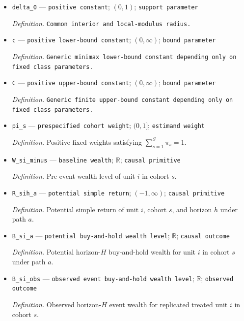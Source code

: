 \documentclass{article}
\begin{document}
\begin{itemize}
  \item \texttt{delta\_\allowbreak{}0} --- \texttt{positive constant}; \((0,1)\); \texttt{support parameter}
  \par\smallskip\noindent\emph{Definition.} \texttt{Common interior and local-\allowbreak{}modulus radius.}
  \item \texttt{c} --- \texttt{positive lower-\allowbreak{}bound constant}; \((0,\infty)\); \texttt{bound parameter}
  \par\smallskip\noindent\emph{Definition.} \texttt{Generic minimax lower-\allowbreak{}bound constant depending only on fixed class parameters.}
  \item \texttt{C} --- \texttt{positive upper-\allowbreak{}bound constant}; \((0,\infty)\); \texttt{bound parameter}
  \par\smallskip\noindent\emph{Definition.} \texttt{Generic finite upper-\allowbreak{}bound constant depending only on fixed class parameters.}
  \item \texttt{pi\_\allowbreak{}s} --- \texttt{prespecified cohort weight}; \((0,1]\); \texttt{estimand weight}
  \par\smallskip\noindent\emph{Definition.} Positive fixed weights satisfying \(\sum_{s=1}^{S}\pi_s=1\).
  \item \texttt{W\_\allowbreak{}si\_\allowbreak{}minus} --- \texttt{baseline wealth}; \(\mathbb R\); \texttt{causal primitive}
  \par\smallskip\noindent\emph{Definition.} Pre-event wealth level of unit \(i\) in cohort \(s\).
  \item \texttt{R\_\allowbreak{}sih\_\allowbreak{}a} --- \texttt{potential simple return}; \((-1,\infty)\); \texttt{causal primitive}
  \par\smallskip\noindent\emph{Definition.} Potential simple return of unit \(i\), cohort \(s\), and horizon \(h\) under path \(a\).
  \item \texttt{B\_\allowbreak{}si\_\allowbreak{}a} --- \texttt{potential buy-\allowbreak{}and-\allowbreak{}hold wealth level}; \(\mathbb R\); \texttt{causal outcome}
  \par\smallskip\noindent\emph{Definition.} Potential horizon-\(H\) buy-and-hold wealth for unit \(i\) in cohort \(s\) under path \(a\).
  \item \texttt{B\_\allowbreak{}si\_\allowbreak{}obs} --- \texttt{observed event buy-\allowbreak{}and-\allowbreak{}hold wealth level}; \(\mathbb R\); \texttt{observed outcome}
  \par\smallskip\noindent\emph{Definition.} Observed horizon-\(H\) event wealth for replicated treated unit \(i\) in cohort \(s\).

\end{itemize}
\end{document}

